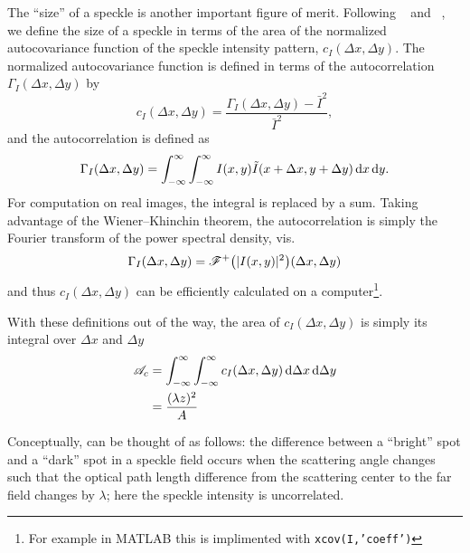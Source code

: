 The ``size'' of a speckle is another important figure of merit.
Following ~\cite{goodman1975statistical} and
~\cite{dainty1975laser}, we define the size of a
speckle in terms of the area of the normalized
autocovariance function of the speckle intensity pattern, $c_I(\Delta x,
\Delta y)$.  The normalized autocovariance function is defined in terms of
the autocorrelation $\Gamma_I(\Delta x, \Delta y)$ by 
\begin{equation}
c_I(\Delta x, \Delta y) = \frac{\Gamma_I(\Delta x, \Delta y) - \bar{I}^2}{\bar{I}^2},
\end{equation}
and the autocorrelation is defined as
\begin{equation}
\Gamma_I(\Delta x, \Delta y) = \int_{-\infty}^{\infty}\int_{-\infty}^{\infty} I(x,y) \tilde{I}(x+\Delta x,y+\Delta y) \,\mathrm{d} x \,\mathrm{d} y.
\end{equation}
For computation on real images, the integral is replaced by a sum.  Taking
advantage of the Wiener–Khinchin theorem, the autocorrelation is simply the
Fourier transform of the power spectral density, vis.
\begin{equation}
\Gamma_I(\Delta x, \Delta y) = {\mathscr{F}^{+}\bigl(|I(x,y)|^2\bigr)}(\Delta x, \Delta y)
\end{equation}
and thus  $c_I(\Delta x, \Delta y)$ can be efficiently calculated on a
computer\footnote{For example in MATLAB this is implimented with
\texttt{xcov(I,'coeff')}}.

With these definitions out of the way, the area of $c_I(\Delta x, \Delta
y)$ is simply its integral over $\Delta x$ and $\Delta y$
\begin{align}
\mathscr{A}_c &= \int_{-\infty}^{\infty}\int_{-\infty}^{\infty} c_I(\Delta x, \Delta y) \,\mathrm{d} \Delta x \,\mathrm{d} \Delta y\\
&=\frac{(\lambda z)^2}{A}
\label{eqn:spotsize}
\end{align}

Conceptually,  can be thought of as follows: the
difference between a ``bright'' spot and a ``dark'' spot in a speckle field
occurs when the scattering angle changes such that the optical path length
difference from the scattering center to the far field changes by
$\lambda$; here the speckle intensity is uncorrelated.

